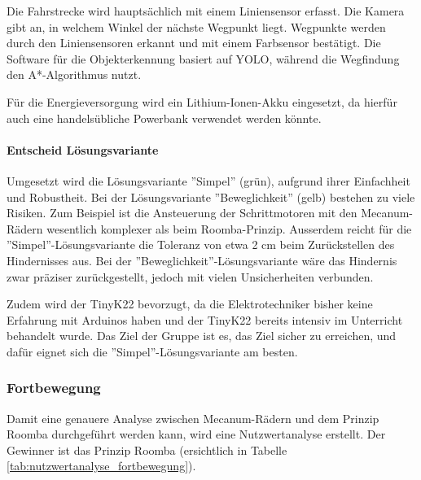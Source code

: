 \documentclass[../main.tex]{subfiles}
\begin{document}
    Die Fahrstrecke wird hauptsächlich mit einem Liniensensor erfasst. Die Kamera gibt an, in welchem Winkel der nächste Wegpunkt liegt. Wegpunkte werden durch den Liniensensoren erkannt und mit einem Farbsensor bestätigt. Die Software für die Objekterkennung basiert auf YOLO, während die Wegfindung den A*-Algorithmus nutzt.

    Für die Energieversorgung wird ein Lithium-Ionen-Akku eingesetzt, da hierfür auch eine handelsübliche Powerbank verwendet werden könnte.

    \paragraph{Entscheid Lösungsvariante}
    \label{a3:EntscheidLösungsvariante}
    Umgesetzt wird die Lösungsvariante ''Simpel'' (grün), aufgrund ihrer Einfachheit und Robustheit. Bei der Lösungsvariante ''Beweglichkeit'' (gelb) bestehen zu viele Risiken. Zum Beispiel ist die Ansteuerung der Schrittmotoren mit den Mecanum-Rädern wesentlich komplexer als beim Roomba-Prinzip. Ausserdem reicht für die ''Simpel''-Lösungsvariante die Toleranz von etwa 2 cm beim Zurückstellen des Hindernisses aus. Bei der ''Beweglichkeit''-Lösungsvariante wäre das Hindernis zwar präziser zurückgestellt, jedoch mit vielen Unsicherheiten verbunden.

    Zudem wird der TinyK22 bevorzugt, da die Elektrotechniker bisher keine Erfahrung mit Arduinos haben und der TinyK22 bereits intensiv im Unterricht behandelt wurde. Das Ziel der Gruppe ist es, das Ziel sicher zu erreichen, und dafür eignet sich die ''Simpel''-Lösungsvariante am besten.
    
    \subsubsection{Fortbewegung}
    \label{a3:Fortbewegung}
    Damit eine genauere Analyse zwischen Mecanum-Rädern und dem Prinzip Roomba durchgeführt werden kann, wird eine Nutzwertanalyse erstellt. Der Gewinner ist das Prinzip Roomba (ersichtlich in Tabelle \ref{tab:nutzwertanalyse_fortbewegung}).
\end{document}
